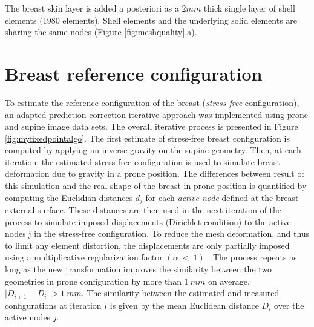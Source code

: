 The breast skin layer is added a posteriori   as a $2mm$ thick single layer of shell elements (1980 elements). Shell elements and the underlying solid elements are sharing the same nodes (Figure \ref{fig:meshquality}.a).



\section{Breast reference configuration}\label{section:myStressFree}
To estimate the reference configuration of the breast (\textit{stress-free} configuration), an adapted prediction-correction iterative approach was implemented \citep{eiben_breast_2014} using prone and supine image data sets. The overall iterative process is presented in Figure \ref{fig:myfixedpointalgo}. The first estimate of stress-free breast configuration is computed by applying an inverse gravity on the supine geometry. Then, at each iteration, the estimated stress-free configuration is used to simulate breast deformation due to gravity in a prone position. The differences between result of this simulation and the real shape of the breast in prone position is quantified by computing the Euclidian distances $d_j$ for each \textit{active node} defined at the breast external surface. These distances are then used in the next iteration of the process to simulate imposed displacements (Dirichlet condition) to the active nodes j in the stress-free configuration. To reduce the mesh deformation, and thus to limit any element distortion, the displacements are only partially imposed using a multiplicative regularization factor $ (\alpha\ <\ 1)$ . The process repeats as long as the new transformation improves the similarity between the two geometries in prone configuration by more than $1\ mm$ on average, $\vert D_{i+1}-D_i \vert > 1\ mm$. The similarity between the estimated and measured configurations at iteration $i$ is given by the mean Euclidean distance $D_i$ over the active nodes $j$.                                                              

